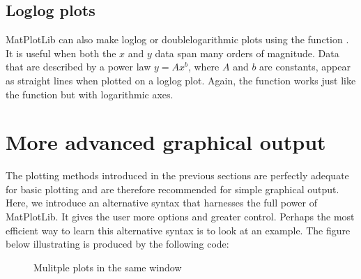 \documentclass[letterpaper,10pt,english]{sphinxmanual}
\let\sphinxpxdimen\pdfpxdimen\else\newdimen\sphinxpxdimen
\begin{document}
\subsection{Log\sphinxhyphen{}log plots}
\label{\detokenize{chap5/chap5_plot:log-log-plots}}
\ignorespaces 
\sphinxAtStartPar
MatPlotLib can also make log\sphinxhyphen{}log or double\sphinxhyphen{}logarithmic plots using the function .  It is useful when both the \(x\) and \(y\) data span many orders of magnitude.  Data that are described by a power law \(y=Ax^b\), where \(A\) and \(b\) are constants, appear as straight lines when plotted on a log\sphinxhyphen{}log plot.  Again, the  function works just like the  function but with logarithmic axes.


\section{More advanced graphical output}
\label{\detokenize{chap5/chap5_plot:more-advanced-graphical-output}}
\sphinxAtStartPar
The plotting methods introduced in the previous sections are perfectly adequate for basic plotting and are therefore recommended for simple graphical output.  Here, we introduce an alternative syntax that harnesses the full power of MatPlotLib.  It gives the user more options and greater control.  Perhaps the most efficient way to learn this alternative syntax is to look at an example.  The figure below illustrating {\hyperref[\detokenize{chap5/chap5_plot:multplotdemo}]{}} is produced by the following code:

\begin{figure}[htbp]
\centering
\capstart

\noindent\sphinxincludegraphics[width=320.00000\sphinxpxdimen]{{MultPlotDemo}.pdf}
\caption{Mulitple plots in the same window}\label{\detokenize{chap5/chap5_plot:id10}}\label{\detokenize{chap5/chap5_plot:multplotdemo}}\end{figure}
\end{document}
